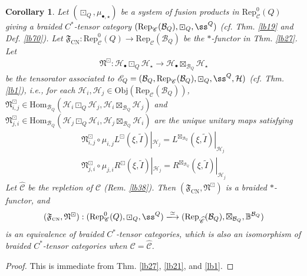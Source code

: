 \documentclass[11pt,b5paper,notitlepage]{article}
\theoremstyle{definition}
\theoremstyle{plain}
\newtheorem{co}[df]{Corollary}
\newcommand{\fk}{\mathfrak}
\newcommand{\mc}{\mathcal}
\newcommand{\wtd}{\widetilde}
\newcommand{\wht}{\widehat}
\newcommand{\Hom}{\mathrm{Hom}}
\newcommand{\Rep}{\mathrm{Rep}}
\newcommand{\scr}{\mathscr}
\newcommand{\mbb}{\mathbb}
\newcommand{\blt}{\bullet}
\newcommand{\Obj}{\mathrm{Obj}}
\newcommand{\CN}{{\scriptscriptstyle \mathrm{CN}}}
\numberwithin{equation}{section}
\begin{document}
\begin{co}\label{lb41}
Let $(\boxdot_Q,\mu_{\blt,\star})$ be a system of fusion products in $\Rep^0_{\scr C}(Q)$ giving a braided $C^*$-tensor category $(\Rep_{\scr C}(\mc B_Q),\boxdot_Q,\ss^Q)$ (cf. Thm. \ref{lb19} and Def. \ref{lb70}). Let $\fk F_\CN:\Rep^0_{\scr C}(Q)\rightarrow\Rep_{\scr C}(\mc B_Q)$ be the $*$-functor in Thm. \ref{lb27}. Let 
\begin{align*}
\fk N^\boxdot:\mc H_\blt\boxdot_Q\mc H_\star\rightarrow\mc H_\blt\boxtimes_{\mc B_Q}\mc H_\star
\end{align*}
be the tensorator associated to $\scr E_Q=(\mc B_Q,\Rep_{\scr C}(\mc B_Q),\boxdot_Q,\ss^Q,\mc H)$ (cf. Thm. \ref{lb1}), i.e., for each $\mc H_i,\mc H_j\in\Obj(\Rep_{\scr C}(\mc B_Q))$, $\fk N^\boxdot_{i,j}\in\Hom_{\mc B_Q}(\mc H_i\boxdot_Q\mc H_j,\mc H_i\boxtimes_{\mc B_Q}\mc H_j)$ and $\fk N^\boxdot_{j,i}\in\Hom_{\mc B_Q}(\mc H_j\boxdot_Q\mc H_i,\mc H_j\boxtimes_{\mc B_Q}\mc H_i)$ are the unique unitary maps satisfying
\begin{subequations}\label{eq32}
\begin{gather}
\fk N^\boxdot_{i,j}\circ \mu_{i,j}L^{\boxdot}(\xi,\wtd I)|_{\mc H_j}=L^{\boxtimes_{\mc B_Q}}(\xi,\wtd I)|_{\mc H_j}\\
\fk N^\boxdot_{j,i}\circ \mu_{j,i}R^{\boxdot}(\xi,\wtd I)|_{\mc H_j}=R^{\boxtimes_{\mc B_Q}}(\xi,\wtd I)|_{\mc H_j}
\end{gather}
\end{subequations}
Let $\wht{\scr C}$ be the repletion of $\scr C$ (Rem. \ref{lb38}). Then $(\fk F_\CN,\fk N^\boxdot)$ is a braided $*$-functor, and
\begin{align}\label{eq104}
(\fk F_\CN,\fk N^\boxdot):(\Rep_{\scr C}^0(Q),\boxdot_Q,\ss^Q)\xlongrightarrow{\simeq} (\Rep_{\wht{\scr C}}(\mc B_Q),\boxtimes_{\mc B_Q},\mbb B^{\mc B_Q})
\end{align}
is an equivalence of braided $C^*$-tensor categories, which is also an isomorphism of braided $C^*$-tensor categories when $\scr C=\wht{\scr C}$.
\end{co}



\begin{proof}
This is immediate from Thm. \ref{lb27}, \ref{lb21}, and \ref{lb1}.
\end{proof}
\end{document}
